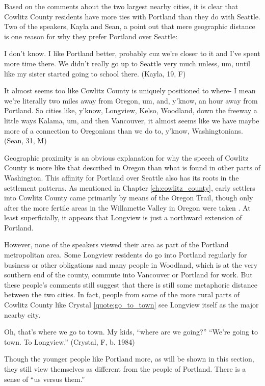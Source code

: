 Based on the comments about the two largest nearby cities, it is clear that Cowlitz County residents have more ties with Portland than they do with Seattle. Two of the speakers, Kayla and Sean, a point out that mere geographic distance is one reason for why they prefer Portland over Seattle:
\begin{num_quote}
    I don't know. I like Portland better, probably cuz we're closer to it and I've spent more time there. We didn't really go up to Seattle very much unless, um, until like my sister started going to school there. (Kayla, 19, F)
    \label{quote:i_like_portland_better}
\end{num_quote}
\begin{num_quote}
    It almost seems too like Cowlitz County is uniquely positioned to where- I mean we're literally two miles away from Oregon, um, and, y'know, an hour away from Portland. So cities like, y'know, Longview, Kelso, Woodland, down the freeway a little ways Kalama, um, and then Vancouver, it almost seems like we have maybe more of a connection to Oregonians than we do to, y'know, Washingtonians. (Sean, 31, M)
    \label{quote:connection_to_oregonians}
\end{num_quote}
Geographic proximity is an obvious explanation for why the speech of Cowlitz County is more like that described in Oregon than what is found in other parts of Washington. This affinity for Portland over Seattle also has its roots in the settlement patterns. As mentioned in Chapter \ref{ch:cowlitz_county}, early settlers into Cowlitz County came primarily by means of the Oregon Trail, though only after the more fertile areas in the Willamette Valley in Oregon were taken \citep[37]{urrutia_1998}. At least superficially, it appears that Longview is just a northward extension of Portland.

However, none of the speakers viewed their area as part of the Portland metropolitan area. Some Longview residents do go into Portland regularly for business or other obligations and many people in Woodland, which is at the very southern end of the county, commute into Vancouver or Portland for work. But these people's comments still suggest that there is still some metaphoric distance between the two cities. In fact, people from some of the more rural parts of Cowlitz County like Crystal \ref{quote:go_to_town} see Longview itself as the major nearby city.
\begin{num_quote}
    Oh, that's where we go to town. My kids, ``where are we going?'' ``We're going to town. To Longview.'' (Crystal, F, b. 1984)
    \label{quote:go_to_town}
\end{num_quote}
Though the younger people like Portland more, as will be shown in this section, they still view themselves as different from the people of Portland. There is a sense of ``us versus them.''

